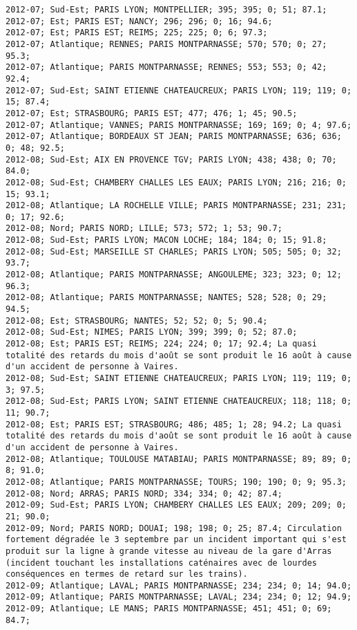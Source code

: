 \documentclass{article}
\begin{document}
\begin{Verbatim}[commandchars=\\\{\}]
2012-07; Sud-Est; PARIS LYON; MONTPELLIER; 395; 395; 0; 51; 87.1; 
2012-07; Est; PARIS EST; NANCY; 296; 296; 0; 16; 94.6; 
2012-07; Est; PARIS EST; REIMS; 225; 225; 0; 6; 97.3; 
2012-07; Atlantique; RENNES; PARIS MONTPARNASSE; 570; 570; 0; 27; 95.3; 
2012-07; Atlantique; PARIS MONTPARNASSE; RENNES; 553; 553; 0; 42; 92.4; 
2012-07; Sud-Est; SAINT ETIENNE CHATEAUCREUX; PARIS LYON; 119; 119; 0; 15; 87.4; 
2012-07; Est; STRASBOURG; PARIS EST; 477; 476; 1; 45; 90.5; 
2012-07; Atlantique; VANNES; PARIS MONTPARNASSE; 169; 169; 0; 4; 97.6; 
2012-07; Atlantique; BORDEAUX ST JEAN; PARIS MONTPARNASSE; 636; 636; 0; 48; 92.5; 
2012-08; Sud-Est; AIX EN PROVENCE TGV; PARIS LYON; 438; 438; 0; 70; 84.0; 
2012-08; Sud-Est; CHAMBERY CHALLES LES EAUX; PARIS LYON; 216; 216; 0; 15; 93.1; 
2012-08; Atlantique; LA ROCHELLE VILLE; PARIS MONTPARNASSE; 231; 231; 0; 17; 92.6; 
2012-08; Nord; PARIS NORD; LILLE; 573; 572; 1; 53; 90.7; 
2012-08; Sud-Est; PARIS LYON; MACON LOCHE; 184; 184; 0; 15; 91.8; 
2012-08; Sud-Est; MARSEILLE ST CHARLES; PARIS LYON; 505; 505; 0; 32; 93.7; 
2012-08; Atlantique; PARIS MONTPARNASSE; ANGOULEME; 323; 323; 0; 12; 96.3; 
2012-08; Atlantique; PARIS MONTPARNASSE; NANTES; 528; 528; 0; 29; 94.5; 
2012-08; Est; STRASBOURG; NANTES; 52; 52; 0; 5; 90.4; 
2012-08; Sud-Est; NIMES; PARIS LYON; 399; 399; 0; 52; 87.0; 
2012-08; Est; PARIS EST; REIMS; 224; 224; 0; 17; 92.4; La quasi totalité des retards du mois d'août se sont produit le 16 août à cause d'un accident de personne à Vaires.
2012-08; Sud-Est; SAINT ETIENNE CHATEAUCREUX; PARIS LYON; 119; 119; 0; 3; 97.5; 
2012-08; Sud-Est; PARIS LYON; SAINT ETIENNE CHATEAUCREUX; 118; 118; 0; 11; 90.7; 
2012-08; Est; PARIS EST; STRASBOURG; 486; 485; 1; 28; 94.2; La quasi totalité des retards du mois d'août se sont produit le 16 août à cause d'un accident de personne à Vaires.
2012-08; Atlantique; TOULOUSE MATABIAU; PARIS MONTPARNASSE; 89; 89; 0; 8; 91.0; 
2012-08; Atlantique; PARIS MONTPARNASSE; TOURS; 190; 190; 0; 9; 95.3; 
2012-08; Nord; ARRAS; PARIS NORD; 334; 334; 0; 42; 87.4; 
2012-09; Sud-Est; PARIS LYON; CHAMBERY CHALLES LES EAUX; 209; 209; 0; 21; 90.0; 
2012-09; Nord; PARIS NORD; DOUAI; 198; 198; 0; 25; 87.4; Circulation fortement dégradée le 3 septembre par un incident important qui s'est produit sur la ligne à grande vitesse au niveau de la gare d'Arras (incident touchant les installations caténaires avec de lourdes conséquences en termes de retard sur les trains).
2012-09; Atlantique; LAVAL; PARIS MONTPARNASSE; 234; 234; 0; 14; 94.0; 
2012-09; Atlantique; PARIS MONTPARNASSE; LAVAL; 234; 234; 0; 12; 94.9; 
2012-09; Atlantique; LE MANS; PARIS MONTPARNASSE; 451; 451; 0; 69; 84.7; 

\end{Verbatim}
\end{document}
